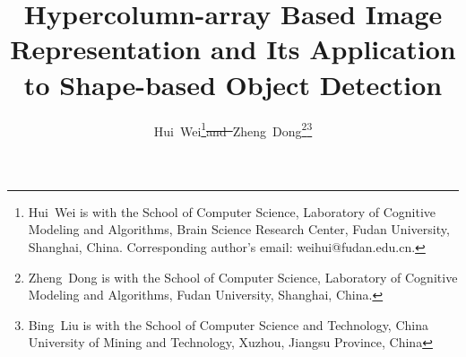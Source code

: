 \documentclass[journal]{IEEEtran}
\providecommand{\DIFadd}[1]{{\protect\color{blue}\uwave{#1}}} %
\providecommand{\DIFdel}[1]{{\protect\color{red}\sout{#1}}}                      %
\providecommand{\DIFaddbegin}{} %
\providecommand{\DIFaddend}{} %
\providecommand{\DIFdelbegin}{} %
\providecommand{\DIFdelend}{} %
\begin{document}
\title{Hypercolumn-array Based Image Representation and 
Its Application to Shape-based Object Detection}
\author{Hui~Wei\thanks{Hui~Wei is with the School of Computer Science, 
Laboratory of Cognitive Modeling and Algorithms, 
Brain Science Research Center, Fudan University, Shanghai, China. 
Corresponding author's email: weihui@fudan.edu.cn.}\DIFdelbegin \DIFdel{and~}\DIFdelend \DIFaddbegin \DIFadd{,
}\DIFaddend Zheng~Dong\thanks{Zheng~Dong is with the School of Computer Science, 
Laboratory of Cognitive Modeling and Algorithms, 
Fudan University, Shanghai, China.}\DIFaddbegin \DIFadd{,
and~Bing~Liu}\thanks{Bing~Liu is with the School of Computer Science and Technology,
China University of Mining and Technology, Xuzhou, Jiangsu Province, China}\DIFaddend }


\maketitle
\end{document}
